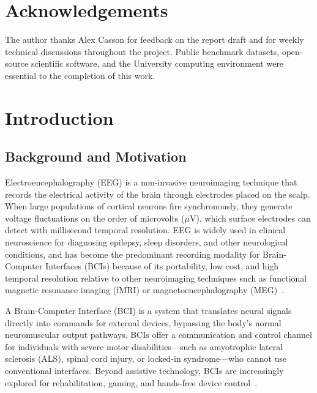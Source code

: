 \documentclass[12pt, a4paper]{article}
\begin{document}
\section*{Acknowledgements}
The author thanks Alex Casson for feedback on the report draft and for weekly technical discussions throughout the project. Public benchmark datasets, open-source scientific software, and the University computing environment were essential to the completion of this work.
\clearpage

\setcounter{page}{1}

\section{Introduction}

\subsection{Background and Motivation}

Electroencephalography (EEG) is a non-invasive neuroimaging technique that records the electrical activity of the brain through electrodes placed on the scalp. When large populations of cortical neurons fire synchronously, they generate voltage fluctuations on the order of microvolts ($\mu$V), which surface electrodes can detect with millisecond temporal resolution. EEG is widely used in clinical neuroscience for diagnosing epilepsy, sleep disorders, and other neurological conditions, and has become the predominant recording modality for Brain-Computer Interfaces (BCIs) because of its portability, low cost, and high temporal resolution relative to other neuroimaging techniques such as functional magnetic resonance imaging (fMRI) or magnetoencephalography (MEG)~\cite{hameed2025enhancing}.

A Brain-Computer Interface (BCI) is a system that translates neural signals directly into commands for external devices, bypassing the body's normal neuromuscular output pathways. BCIs offer a communication and control channel for individuals with severe motor disabilities---such as amyotrophic lateral sclerosis (ALS), spinal cord injury, or locked-in syndrome---who cannot use conventional interfaces. Beyond assistive technology, BCIs are increasingly explored for rehabilitation, gaming, and hands-free device control~\cite{jeong2020multimodal}.
\end{document}
